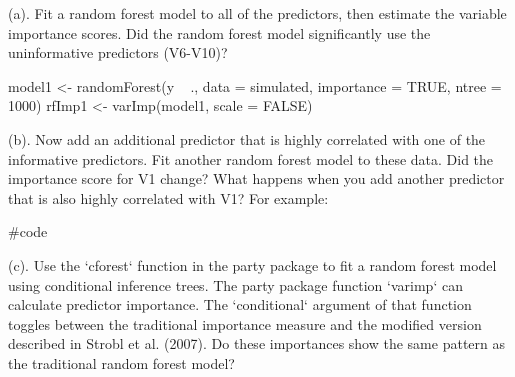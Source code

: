 \documentclass[openany]{report}
\newenvironment{Shaded}{\begin{snugshade}}{\end{snugshade}}
\newcommand{\CommentTok}[1]{\textcolor[rgb]{0.50,0.62,0.50}{#1}}
\newcommand{\DataTypeTok}[1]{\textcolor[rgb]{0.87,0.87,0.75}{#1}}
\newcommand{\DecValTok}[1]{\textcolor[rgb]{0.86,0.86,0.80}{#1}}
\newcommand{\FloatTok}[1]{\textcolor[rgb]{0.75,0.75,0.82}{#1}}
\newcommand{\KeywordTok}[1]{\textcolor[rgb]{0.94,0.87,0.69}{#1}}
\newcommand{\NormalTok}[1]{\textcolor[rgb]{0.80,0.80,0.80}{#1}}
\newcommand{\OperatorTok}[1]{\textcolor[rgb]{0.94,0.94,0.82}{#1}}
\newcommand{\OtherTok}[1]{\textcolor[rgb]{0.94,0.94,0.56}{#1}}
\newcommand{\StringTok}[1]{\textcolor[rgb]{0.80,0.58,0.58}{#1}}
\begin{document}
\begin{subquestion}{(a).} Fit a random forest model to all of the predictors, then estimate the variable importance scores. Did the random forest model significantly use the uninformative predictors (V6-V10)?\end{subquestion}

\begin{Shaded}
\begin{Highlighting}[]
\NormalTok{model1 <-}\StringTok{ }\KeywordTok{randomForest}\NormalTok{(y }\OperatorTok{~}\StringTok{ }\NormalTok{., }\DataTypeTok{data =}\NormalTok{ simulated, }
                       \DataTypeTok{importance =} \OtherTok{TRUE}\NormalTok{, }
                       \DataTypeTok{ntree =} \DecValTok{1000}\NormalTok{)}
\NormalTok{rfImp1 <-}\StringTok{ }\KeywordTok{varImp}\NormalTok{(model1, }\DataTypeTok{scale =} \OtherTok{FALSE}\NormalTok{)}
\end{Highlighting}
\end{Shaded}

\begin{subquestion}{(b).} Now add an additional predictor that is highly correlated with one of the informative predictors. Fit another random forest model to these data. Did the importance score for V1 change? What happens when you add another predictor that is also highly correlated with V1? For example:\end{subquestion}

\begin{Shaded}
\end{Shaded}

\begin{Shaded}
\begin{Highlighting}[]
\CommentTok{#code}
\end{Highlighting}
\end{Shaded}

\begin{subquestion}{(c).} Use the `cforest` function in the party package to fit a random forest model using conditional inference trees. The party package function `varimp` can calculate predictor importance. The `conditional` argument of that function toggles between the traditional importance measure and the modified version described in Strobl et al. (2007). Do these importances show the same pattern as the traditional random forest model?\end{subquestion}
\end{document}
